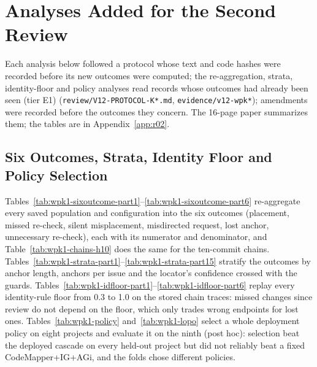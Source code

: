 \section{Analyses Added for the Second Review}\label{sec:r02}
Each analysis below followed a protocol whose text and code hashes were recorded before its new outcomes were computed; the re-aggregation, strata, identity-floor and policy analyses read records whose outcomes had already been seen (tier E1) (\texttt{review/V12-PROTOCOL-K*.md}, \texttt{evidence/v12-wpk*}); amendments were recorded before the outcomes they concern. The 16-page paper summarizes them; the tables are in Appendix~\ref{app:r02}.

\subsection{Six Outcomes, Strata, Identity Floor and Policy Selection}
Tables~\ref{tab:wpk1-sixoutcome-part1}--\ref{tab:wpk1-sixoutcome-part6} re-aggregate every saved population and configuration into the six outcomes (placement, missed re-check, silent misplacement, misdirected request, lost anchor, unnecessary re-check), each with its numerator and denominator, and Table~\ref{tab:wpk1-chains-h10} does the same for the ten-commit chains. Tables~\ref{tab:wpk1-strata-part1}--\ref{tab:wpk1-strata-part15} stratify the outcomes by anchor length, anchors per issue and the locator's confidence crossed with the guards. Tables~\ref{tab:wpk1-idfloor-part1}--\ref{tab:wpk1-idfloor-part6} replay every identity-rule floor from 0.3 to 1.0 on the stored chain traces: missed changes since review do not depend on the floor, which only trades wrong endpoints for lost ones. Tables~\ref{tab:wpk1-policy} and~\ref{tab:wpk1-lopo} select a whole deployment policy on eight projects and evaluate it on the ninth (post hoc): selection beat the deployed cascade on every held-out project but did not reliably beat a fixed CodeMapper+IG+AGi, and the folds chose different policies.

